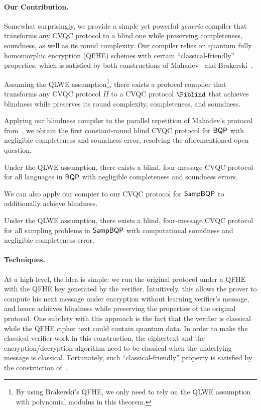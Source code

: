 \paragraph{Our Contribution.} Somewhat surprisingly, we provide a simple yet powerful  
\emph{generic}  compiler that transforms any CVQC protocol to a blind one while preserving completeness, soundness, as well as its round complexity. 
Our compiler relies on quantum fully homomorphic encryption (QFHE) schemes with certain ``classical-friendly'' properties, which is satisfied by both constructions of Mahadev~\cite{mahadev_qfhe} and Brakerski~\cite{brakerski_qfhe}.

\begin{theorem}[informal]
Assuming the QLWE assumption\footnote{By using Brakerski's QFHE, we only need to rely on the QLWE assumption with polynomial modulus in this theorem.}, there exists a protocol compiler that transforms any CVQC protocol $\Pi$ to a CVQC protocol $\Piblind$ that achieves blindness while preserves its round complexity, completeness, and soundness.
\end{theorem}

Applying our blindness compiler to the parallel repetition of Mahadev's protocol from~\cite{arXiv:ChiaChungYam19, arXiv:AlaChiHun19}, we obtain the first constant-round blind CVQC protocol for $\operatorname{\mathsf{BQP}}$ with negligible completeness and soundness error, resolving the aforementioned open question.

\begin{theorem}[informal]
    Under the QLWE assumption, there exists a blind, four-message CVQC protocol for all languages in $\operatorname{\mathsf{BQP}}$ with negligible completeness and soundness errors.
\end{theorem}

We can also apply our compier to our CVQC protocol for $\operatorname{\mathsf{SampBQP}}$ to additionally achieve blindness. 

\begin{theorem}[informal]
        Under the QLWE assumption, there exists a blind, four-message CVQC protocol for all sampling problems in $\operatorname{\mathsf{SampBQP}}$ with  computational soundness and negligible completeness error.
\end{theorem}


\paragraph{Techniques.} At a high-level, the idea is simple: we run the original protocol under a QFHE with the QFHE key generated by the verifier. Intuitively, this allows the prover to compute his next message under encryption without learning verifier's message, and hence achieves blindness while preserving the properties of the original protocol.
One subtlety with this approach is the fact that the verifier is classical while the QFHE cipher text could contain quantum data.
In order to make the classical verifier work in this construction, the ciphertext and the encryption/decryption algorithm need to be classical when the underlying message is classical. Fortunately, such  ``classical-friendly'' property is satisfied by the construction of~\cite{mahadev_qfhe, brakerski_qfhe}.

